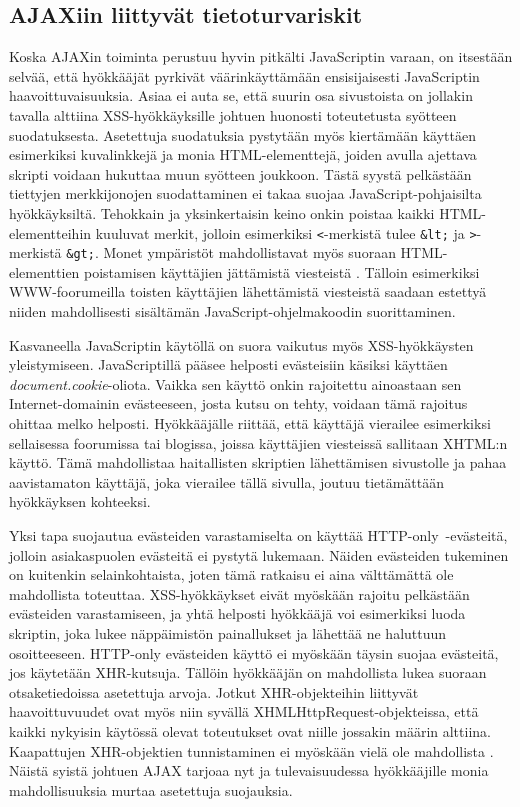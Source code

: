 \subsection{AJAXiin liittyvät tietoturvariskit}

Koska AJAXin toiminta perustuu hyvin pitkälti JavaScriptin varaan, on itsestään selvää, että hyökkääjät pyrkivät väärinkäyttämään ensisijaisesti JavaScriptin haavoittuvaisuuksia.  
Asiaa ei auta se, että suurin osa sivustoista on jollakin tavalla alttiina XSS-hyökkäyksille \cite{WEB2c} johtuen huonosti toteutetusta syötteen suodatuksesta. Asetettuja suodatuksia 
pystytään myös kiertämään käyttäen esimerkiksi kuvalinkkejä ja monia HTML-elementtejä, joiden avulla ajettava skripti voidaan hukuttaa muun syötteen joukkoon. Tästä syystä pelkästään 
tiettyjen merkkijonojen suodattaminen ei takaa suojaa JavaScript-pohjaisilta hyökkäyksiltä. Tehokkain ja yksinkertaisin keino onkin poistaa kaikki HTML-elementteihin kuuluvat merkit, 
jolloin esimerkiksi \texttt{<}-merkistä tulee \texttt{\&lt;} ja \texttt{>}-merkistä \texttt{\&gt;}. Monet ympäristöt mahdollistavat myös suoraan HTML-elementtien poistamisen käyttäjien
jättämistä viesteistä \cite{AJAX}. Tälloin esimerkiksi WWW-foorumeilla toisten käyttäjien lähettämistä viesteistä saadaan estettyä niiden mahdollisesti sisältämän JavaScript-ohjelmakoodin
suorittaminen.

Kasvaneella JavaScriptin käytöllä on suora vaikutus myös XSS-hyökkäysten yleistymiseen. JavaScriptillä pääsee helposti evästeisiin käsiksi käyttäen \emph{document.cookie}-oliota. 
Vaikka sen käyttö onkin rajoitettu ainoastaan sen Internet-domainin evästeeseen, josta kutsu on tehty, voidaan tämä rajoitus ohittaa melko helposti. Hyökkääjälle riittää, että käyttäjä 
vierailee esimerkiksi sellaisessa foorumissa tai blogissa, joissa käyttäjien viesteissä sallitaan XHTML:n käyttö. Tämä mahdollistaa haitallisten skriptien lähettämisen sivustolle ja pahaa
aavistamaton käyttäjä, joka vierailee tällä sivulla, joutuu tietämättään hyökkäyksen kohteeksi.

Yksi tapa suojautua evästeiden varastamiselta on käyttää HTTP-only~-evästeitä, jolloin asiakaspuolen evästeitä ei pystytä lukemaan. Näiden evästeiden tukeminen on kuitenkin selainkohtaista,
joten tämä ratkaisu ei aina välttämättä ole mahdollista toteuttaa. XSS-hyökkäykset eivät myöskään rajoitu pelkästään evästeiden varastamiseen, ja yhtä helposti hyökkääjä voi esimerkiksi
luoda skriptin, joka lukee näppäimistön painallukset ja lähettää ne haluttuun osoitteeseen. HTTP-only evästeiden käyttö ei myöskään täysin suojaa evästeitä, jos käytetään XHR-kutsuja. 
Tällöin hyökkääjän on mahdollista lukea suoraan otsaketiedoissa asetettuja arvoja. Jotkut XHR-objekteihin liittyvät haavoittuvuudet ovat myös niin syvällä XHMLHttpRequest-objekteissa, että 
kaikki nykyisin käytössä olevat toteutukset ovat niille jossakin määrin alttiina. Kaapattujen XHR-objektien tunnistaminen ei myöskään vielä ole mahdollista \cite{AJAX}. Näistä syistä johtuen 
AJAX tarjoaa nyt ja tulevaisuudessa hyökkääjille monia mahdollisuuksia murtaa asetettuja suojauksia.

